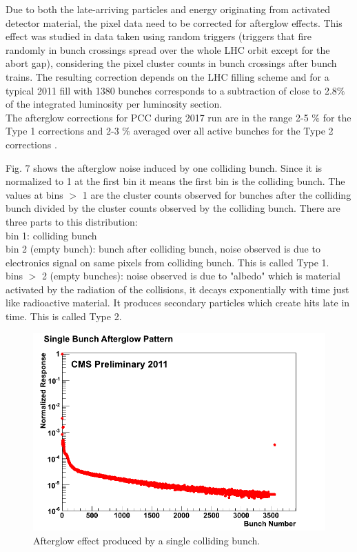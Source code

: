 Due to both the late-arriving particles and energy originating from activated detector material, the pixel data need to be corrected for afterglow effects. This effect was studied in data taken using random triggers (triggers that fire randomly in bunch crossings spread over the whole LHC orbit except for the abort gap), considering the pixel cluster counts in bunch crossings after bunch trains. The resulting correction depends on the LHC filling scheme and for a typical 2011 fill with 1380 bunches corresponds to a subtraction of close to 2.8$\%$ of the integrated luminosity per luminosity section. \\

The afterglow corrections for PCC during 2017 run are in the range 2-5 $\%$ for the Type 1 corrections and 2-3 $\%$ averaged over all active bunches for the Type 2 corrections \cite{Sirunyan:2759951}.


Fig. 7 shows the afterglow noise induced by one colliding bunch. Since it is normalized to 1 at the first bin it means the first bin is the colliding bunch. The values at bins $>$ 1 are the cluster counts observed for bunches after the colliding bunch divided by the cluster counts observed by the colliding bunch. There are three parts to this distribution: \\

bin 1: colliding bunch \\

bin 2 (empty bunch): bunch after colliding bunch, noise observed is due to electronics signal on same pixels from colliding bunch. This is called Type 1. \\

bins $>$ 2 (empty bunches): noise observed is due to "albedo" which is material activated by the radiation of the collisions, it decays exponentially with time just like radioactive material. It produces secondary particles which create hits late in time. This is called Type 2.


\begin{figure}[H]
  \centering
  \includegraphics[width=0.5\columnwidth]{./SingleBunchAfterglow.png}
  \caption{Afterglow effect produced by a single colliding bunch.}
  \label{fig:LHC}
\end{figure}

